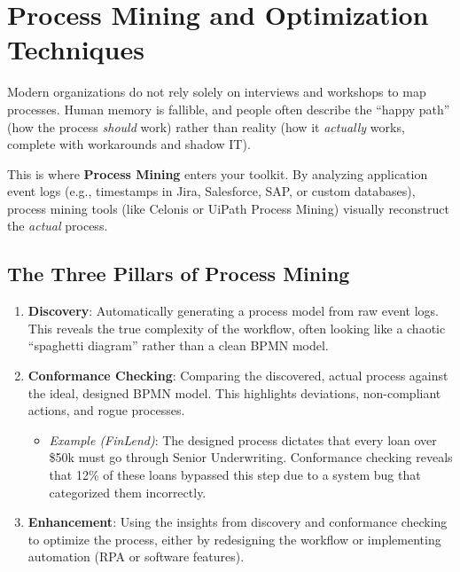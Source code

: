 \documentclass[
  11pt,
  openany,
  oneside]{book}
\providecommand{\tightlist}{%
  \setlength{\itemsep}{0pt}\setlength{\parskip}{0pt}}
\begin{document}
\bigskip

\section{Process Mining and Optimization
Techniques}\label{process-mining-and-optimization-techniques}

Modern organizations do not rely solely on interviews and workshops to
map processes. Human memory is fallible, and people often describe the
``happy path'' (how the process \emph{should} work) rather than reality
(how it \emph{actually} works, complete with workarounds and shadow IT).

This is where \textbf{Process Mining} enters your toolkit. By analyzing
application event logs (e.g., timestamps in Jira, Salesforce, SAP, or
custom databases), process mining tools (like Celonis or UiPath Process
Mining) visually reconstruct the \emph{actual} process.

\subsection{The Three Pillars of Process
Mining}\label{the-three-pillars-of-process-mining}

\begin{enumerate}
\def\labelenumi{\arabic{enumi}.}
\tightlist
\item
  \textbf{Discovery}: Automatically generating a process model from raw
  event logs. This reveals the true complexity of the workflow, often
  looking like a chaotic ``spaghetti diagram'' rather than a clean BPMN
  model.
\item
  \textbf{Conformance Checking}: Comparing the discovered, actual
  process against the ideal, designed BPMN model. This highlights
  deviations, non-compliant actions, and rogue processes.

  \begin{itemize}
  \tightlist
  \item
    \emph{Example (FinLend)}: The designed process dictates that every
    loan over \$50k must go through Senior Underwriting. Conformance
    checking reveals that 12\% of these loans bypassed this step due to
    a system bug that categorized them incorrectly.
  \end{itemize}
\item
  \textbf{Enhancement}: Using the insights from discovery and
  conformance checking to optimize the process, either by redesigning
  the workflow or implementing automation (RPA or software features).
\end{enumerate}
\end{document}
